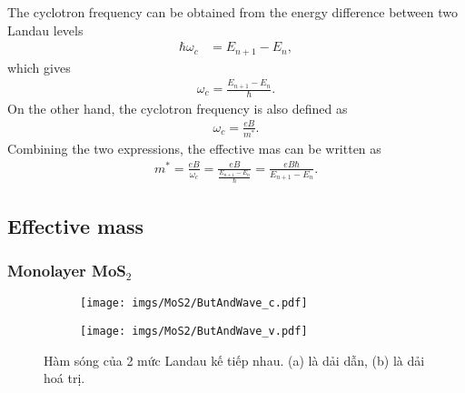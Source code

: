 \documentclass{article}
\begin{document}
%
%

The cyclotron frequency can be obtained from the energy difference between two Landau levels
\begin{equation}
	\begin{aligned}
		\hbar \omega_{c}       & = E_{n+1} - E_{n}  ,
	\end{aligned}
\end{equation}
which gives
\begin{equation}
  \begin{aligned}
    \omega_{c}  = \frac{E_{n+1} - E_{n}}{\hbar}.
  \end{aligned}
\end{equation}
On the other hand, the cyclotron frequency is also defined as
\begin{gather}
	\omega_{c}         = \frac{eB}{m^{*}}.
\end{gather}
Combining the two expressions, the effective mas can be written as 
\begin{gather}
	m^{*}  =  \frac{eB}{\omega_{c}} = \frac{eB}{\frac{E_{n+1} - E_{n}}{\hbar}} = \frac{eB \hbar}{E_{n+1} - E_{n}}.
\end{gather}


\newpage
\subsection{Effective mass}
\subsubsection*{Monolayer MoS$_{2}$}

\begin{figure}[htb]
	\begin{subfigure}{0.495\textwidth}
		\centering
		\texttt{[image: imgs/MoS2/ButAndWave\_c.pdf]}
	\end{subfigure}
	\begin{subfigure}{0.495\textwidth}
		\centering
		\texttt{[image: imgs/MoS2/ButAndWave\_v.pdf]}
	\end{subfigure}
	\caption{Hàm sóng của 2 mức Landau kế tiếp nhau. (a) là dải dẫn, (b) là dải hoá trị.}
\end{figure}
\end{document}
